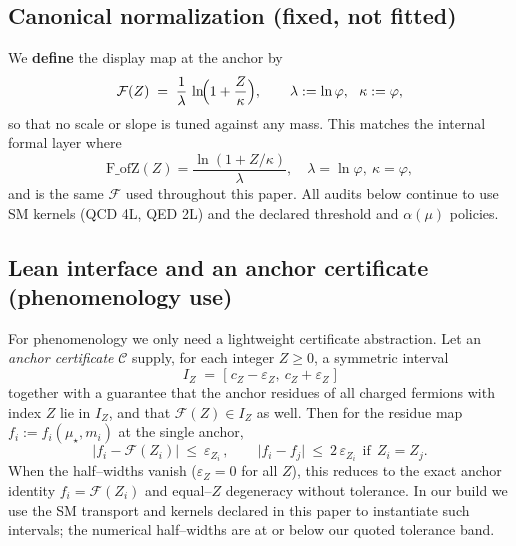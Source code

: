 \documentclass[epjc3]{svjour3}
\begin{document}

\subsection*{Canonical normalization (fixed, not fitted)}
We \textbf{define} the display map at the anchor by
\[
\mathcal F(Z)\;=\;\frac{1}{\lambda}\,\ln\!\Bigl(1+\frac{Z}{\kappa}\Bigr),
\qquad
\lambda:=\ln\varphi,\ \ \kappa:=\varphi,
\]
so that no scale or slope is tuned against any mass. This matches the internal formal layer where
\[
\mathrm{F\_ofZ}(Z)=\frac{\ln(1+Z/\kappa)}{\lambda},\quad
\lambda=\ln\varphi,\ \kappa=\varphi,
\]
and is the same $\mathcal F$ used throughout this paper. All audits below continue to use SM kernels (QCD 4L, QED 2L) and the declared threshold and $\alpha(\mu)$ policies.

\subsection*{Lean interface and an anchor certificate (phenomenology use)}
For phenomenology we only need a lightweight certificate abstraction. Let an \emph{anchor certificate} $\mathcal C$ supply, for each integer $Z\ge0$, a symmetric interval
\[
I_Z \;=\; \bigl[\;c_Z-\varepsilon_Z,\ c_Z+\varepsilon_Z\;\bigr]
\]
together with a guarantee that the anchor residues of all charged fermions with index $Z$ lie in $I_Z$, and that $\mathcal F(Z)\in I_Z$ as well. Then for the residue map $f_i:=f_i(\mu_\star,m_i)$ at the single anchor,
\[
\boxed{\ \ \lvert f_i-\mathcal F(Z_i)\rvert\ \le\ \varepsilon_{Z_i}\,,\qquad
\lvert f_i-f_j\rvert\ \le\ 2\,\varepsilon_{Z_i}\ \ \text{if}\ \ Z_i=Z_j.\ \ }
\]
When the half–widths vanish ($\varepsilon_Z=0$ for all $Z$), this reduces to the exact anchor identity $f_i=\mathcal F(Z_i)$ and equal–$Z$ degeneracy without tolerance. In our build we use the SM transport and kernels declared in this paper to instantiate such intervals; the numerical half–widths are at or below our quoted tolerance band.
\end{document}
